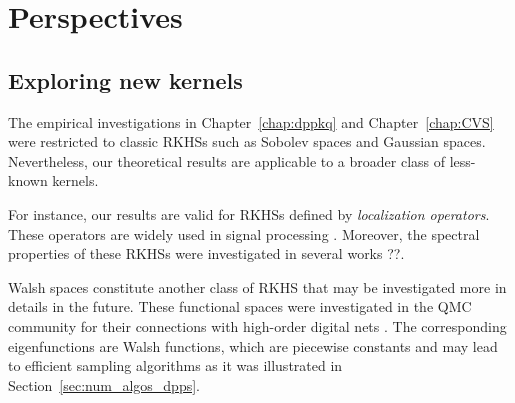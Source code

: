 \documentclass[twoside,11pt]{book}
\numberwithin{theorem}{chapter}
\numberwithin{definition}{chapter}
\numberwithin{proposition}{chapter}
\numberwithin{corollary}{chapter}
\numberwithin{example}{chapter}
\numberwithin{lemma}{chapter}
\numberwithin{assumption}{chapter}
\numberwithin{equation}{chapter}
\numberwithin{figure}{chapter}
\DeclareMathOperator{\X}{\mathcal{X}}
\begin{document}











\section{Perspectives}


\subsection{Exploring new kernels}\label{sec:new_kernels}

The empirical investigations in Chapter~\ref{chap:dppkq} and Chapter~\ref{chap:CVS} were restricted to  classic RKHSs such as Sobolev spaces and Gaussian spaces. Nevertheless, our theoretical results are applicable to a broader class of less-known kernels.


For instance, our results are valid for RKHSs defined by \emph{localization operators}. These operators are widely used in signal processing \citep{SlPo61,LaPo61,Dau88}. Moreover, the spectral properties of these RKHSs were investigated in several works ??.


Walsh spaces constitute another class of RKHS that may be investigated more in details in the future. These functional spaces were investigated in the QMC community for their connections with high-order digital nets \citep{Dic08}. The corresponding eigenfunctions are Walsh functions, which are piecewise constants and may lead to efficient sampling algorithms as it was illustrated in Section~\ref{sec:num_algos_dpps}. 
\end{document}
